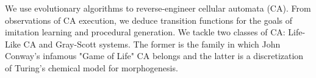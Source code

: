  We use evolutionary algorithms to reverse-engineer cellular automata (CA). From observations of CA execution, we deduce transition functions for the goals of imitation learning and procedural generation. We tackle two classes of CA: Life-Like CA and Gray-Scott systems. The former is the family in which John Conway's infamous "Game of Life" CA belongs and the latter is a discretization of Turing's chemical model for morphogenesis.\\